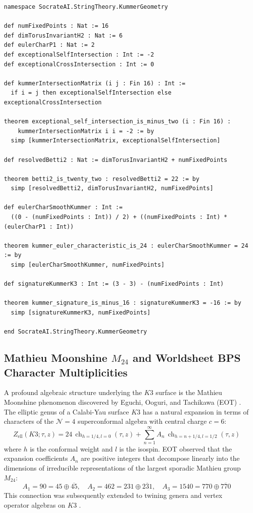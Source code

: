 \documentclass[11pt,a4paper]{article}
\begin{document}
\begin{lstlisting}[language=lean, caption={Lean 4 Encoding of Kummer Surface Topological Invariants, \texttt{proofs/KummerOrbifoldResolution.lean}}]
namespace SocrateAI.StringTheory.KummerGeometry

def numFixedPoints : Nat := 16
def dimTorusInvariantH2 : Nat := 6
def eulerCharP1 : Nat := 2
def exceptionalSelfIntersection : Int := -2
def exceptionalCrossIntersection : Int := 0

def kummerIntersectionMatrix (i j : Fin 16) : Int :=
  if i = j then exceptionalSelfIntersection else exceptionalCrossIntersection

theorem exceptional_self_intersection_is_minus_two (i : Fin 16) :
    kummerIntersectionMatrix i i = -2 := by
  simp [kummerIntersectionMatrix, exceptionalSelfIntersection]

def resolvedBetti2 : Nat := dimTorusInvariantH2 + numFixedPoints

theorem betti2_is_twenty_two : resolvedBetti2 = 22 := by
  simp [resolvedBetti2, dimTorusInvariantH2, numFixedPoints]

def eulerCharSmoothKummer : Int :=
  ((0 - (numFixedPoints : Int)) / 2) + ((numFixedPoints : Int) * (eulerCharP1 : Int))

theorem kummer_euler_characteristic_is_24 : eulerCharSmoothKummer = 24 := by
  simp [eulerCharSmoothKummer, numFixedPoints]

def signatureKummerK3 : Int := (3 - 3) - (numFixedPoints : Int)

theorem kummer_signature_is_minus_16 : signatureKummerK3 = -16 := by
  simp [signatureKummerK3, numFixedPoints]

end SocrateAI.StringTheory.KummerGeometry
\end{lstlisting}


\subsection{Mathieu Moonshine \texorpdfstring{$M_{24}$}{M24} and Worldsheet BPS Character Multiplicities}
A profound algebraic structure underlying the $K3$ surface is the Mathieu Moonshine phenomenon discovered by Eguchi, Ooguri, and Tachikawa (EOT) \cite{eguchi2011}. The elliptic genus of a Calabi-Yau surface $K3$ has a natural expansion in terms of characters of the $\mathcal{N}=4$ superconformal algebra with central charge $c=6$:
\begin{equation}
Z_{\text{ell}}(K3; \tau, z) = 24 \, \operatorname{ch}_{h=1/4, l=0}(\tau, z) + \sum_{n=1}^\infty A_n \, \operatorname{ch}_{h=n+1/4, l=1/2}(\tau, z)
\end{equation}
where $h$ is the conformal weight and $l$ is the isospin. EOT observed that the expansion coefficients $A_n$ are positive integers that decompose linearly into the dimensions of irreducible representations of the largest sporadic Mathieu group $M_{24}$:
\begin{equation}
A_1 = 90 = 45 \oplus \overline{45}, \quad A_2 = 462 = 231 \oplus \overline{231}, \quad A_3 = 1540 = 770 \oplus \overline{770}
\end{equation}
This connection was subsequently extended to twining genera and vertex operator algebras on $K3$ \cite{cheng2010}.
\end{document}
